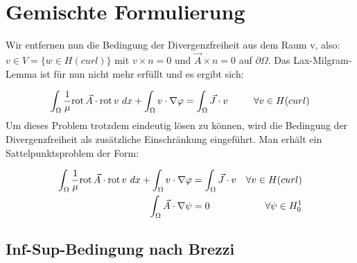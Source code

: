 \section{Gemischte Formulierung}
Wir entfernen nun die Bedingung der Divergenzfreiheit aus dem Raum v, also: $v\in V = \{w \in H(curl)\}$ mit $v\times n = 0$ und $\vec{A}\times n = 0$ auf $\partial\Omega$. Das Lax-Milgram-Lemma ist f\"ur nun nicht mehr erf\"ullt und es ergibt sich: 
\par
\begin{equation}
	\int_\Omega \frac{1}{\mu}\mathrm{rot}\, \vec{A} \cdot \mathrm{rot}\, v ~dx + \int_\Omega v\cdot\nabla\varphi = \int_\Omega \vec{J}\cdot v ~~~~~~~~\forall v \in H(curl)
\end{equation}
Um dieses Problem trotzdem eindeutig l\"osen zu k\"onnen, wird die Bedingung der Divergenzfreiheit als zus\"atzliche Einschr\"ankung eingef\"uhrt. Man erh\"alt ein Sattelpunktsproblem der Form:
\par
\begin{align}
	\int_\Omega \frac{1}{\mu}\mathrm{rot}\, \vec{A} \cdot \mathrm{rot}\, v ~dx + \int_\Omega v\cdot\nabla\varphi & = \int_\Omega \vec{J}\cdot v &\forall v \in H(curl) \\
	\int_\Omega \vec{A}\cdot \nabla\psi &= 0 &\forall\psi\in H^1_0
\end{align}


\subsection{Inf-Sup-Bedingung nach Brezzi}

